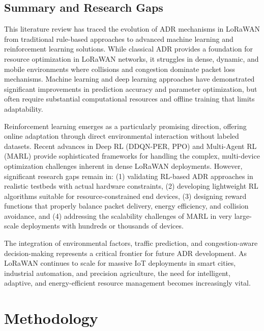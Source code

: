 \documentclass[12pt,a4paper]{article}
\begin{document}
\subsection{Summary and Research Gaps}

This literature review has traced the evolution of ADR mechanisms in LoRaWAN from traditional rule-based approaches to advanced machine learning and reinforcement learning solutions. While classical ADR provides a foundation for resource optimization in LoRaWAN networks, it struggles in dense, dynamic, and mobile environments where collisions and congestion dominate packet loss mechanisms. Machine learning and deep learning approaches have demonstrated significant improvements in prediction accuracy and parameter optimization, but often require substantial computational resources and offline training that limits adaptability.

Reinforcement learning emerges as a particularly promising direction, offering online adaptation through direct environmental interaction without labeled datasets. Recent advances in Deep RL (DDQN-PER, PPO) and Multi-Agent RL (MARL) provide sophisticated frameworks for handling the complex, multi-device optimization challenges inherent in dense LoRaWAN deployments. However, significant research gaps remain in: (1) validating RL-based ADR approaches in realistic testbeds with actual hardware constraints, (2) developing lightweight RL algorithms suitable for resource-constrained end devices, (3) designing reward functions that properly balance packet delivery, energy efficiency, and collision avoidance, and (4) addressing the scalability challenges of MARL in very large-scale deployments with hundreds or thousands of devices.

The integration of environmental factors, traffic prediction, and congestion-aware decision-making represents a critical frontier for future ADR development. As LoRaWAN continues to scale for massive IoT deployments in smart cities, industrial automation, and precision agriculture, the need for intelligent, adaptive, and energy-efficient resource management becomes increasingly vital.


\section{Methodology}
\label{sec:methodology}
\end{document}
